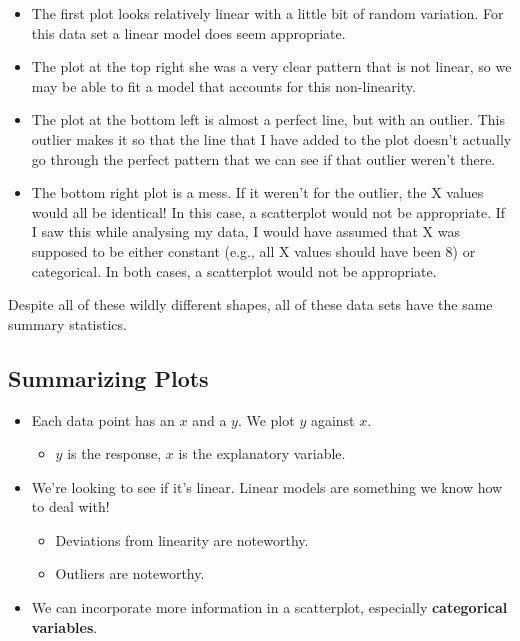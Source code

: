 \documentclass[
  letterpaper,
  DIV=11,
  numbers=noendperiod]{scrreprt}
\providecommand{\tightlist}{%
  \setlength{\itemsep}{0pt}\setlength{\parskip}{0pt}}\usepackage{longtable,booktabs,array}
\begin{document}
\begin{itemize}
\tightlist
\item
  The first plot looks relatively linear with a little bit of random
  variation. For this data set a linear model does seem appropriate.
\item
  The plot at the top right she was a very clear pattern that is not
  linear, so we may be able to fit a model that accounts for this
  non-linearity.
\item
  The plot at the bottom left is almost a perfect line, but with an
  outlier. This outlier makes it so that the line that I have added to
  the plot doesn't actually go through the perfect pattern that we can
  see if that outlier weren't there.
\item
  The bottom right plot is a mess. If it weren't for the outlier, the X
  values would all be identical! In this case, a scatterplot would not
  be appropriate. If I saw this while analysing my data, I would have
  assumed that X was supposed to be either constant (e.g., all X values
  should have been 8) or categorical. In both cases, a scatterplot would
  not be appropriate.
\end{itemize}

Despite all of these wildly different shapes, all of these data sets
have the same summary statistics.

\hypertarget{summarizing-plots}{%
\subsection{Summarizing Plots}\label{summarizing-plots}}

\begin{itemize}
\tightlist
\item
  Each data point has an \(x\) and a \(y\). We plot \(y\) against \(x\).

  \begin{itemize}
  \tightlist
  \item
    \(y\) is the response, \(x\) is the explanatory variable.
  \end{itemize}
\item
  We're looking to see if it's linear. Linear models are something we
  know how to deal with!

  \begin{itemize}
  \tightlist
  \item
    Deviations from linearity are noteworthy.
  \item
    Outliers are noteworthy.
  \end{itemize}
\item
  We can incorporate more information in a scatterplot, especially
  \textbf{categorical variables}.
\end{itemize}
\end{document}

